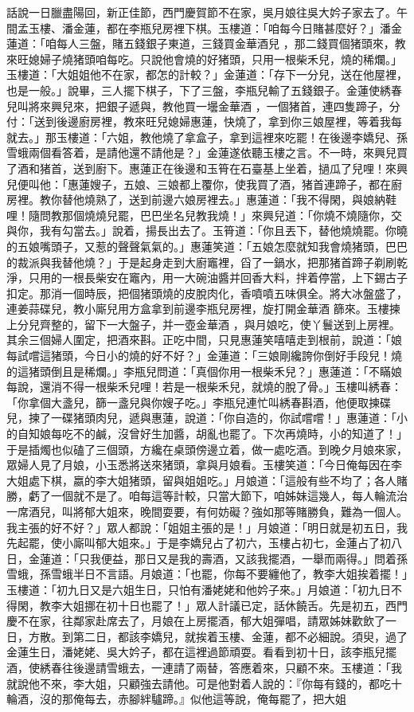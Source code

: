 \begin{showcontents}{}
話說一日臘盡陽回，新正佳節，西門慶賀節不在家，吳月娘往吳大妗子家去了。午間孟玉樓、潘金蓮，都在李瓶兒房裡下棋。玉樓道：「咱每今日賭甚麼好？」潘金蓮道：「咱每人三盤，賭五錢銀子東道，三錢買金華酒兒 ，那二錢買個猪頭來，教來旺媳婦子燒猪頭咱每吃。只說他會燒的好猪頭，只用一根柴禾兒，燒的稀爛。」玉樓道：「大姐姐他不在家，都怎的計較？」金蓮道：「存下一分兒，送在他屋裡，也是一般。」說畢，三人擺下棋子，下了三盤，李瓶兒輸了五錢銀子。金蓮使綉春兒叫將來興兒來，把銀子遞與，教他買一壜金華酒 ，一個猪首，連四隻蹄子，分付：「送到後邊廚房裡，教來旺兒媳婦惠蓮，快燒了，拿到你三娘屋裡，等着我每就去。」那玉樓道：「六姐，教他燒了拿盒子，拿到這裡來吃罷！在後邊李嬌兒、孫雪蛾兩個看答着，是請他還不請他是？」金蓮遂依聽玉樓之言。不一時，來興兒買了酒和猪首，送到廚下。惠蓮正在後邊和玉筲在石臺基上坐着，撾瓜了兒哩！來興兒便叫他：「惠蓮嫂子，五娘、三娘都上覆你，使我買了酒，猪首連蹄子，都在廚房裡。教你替他燒熟了，送到前邊六娘房裡去。」惠蓮道：「我不得閑，與娘納鞋哩！隨問教那個燒燒兒罷，巴巴坐名兒教我燒！」來興兒道：「你燒不燒隨你，交與你，我有勾當去。」說着，揚長出去了。玉筲道：「你且丟下，替他燒燒罷。你曉的五娘嘴頭子，又惹的聲聲氣氣的。」惠蓮笑道：「五娘怎麼就知我會燒猪頭，巴巴的裁派與我替他燒？」于是起身走到大廚竈裡，舀了一鍋水，把那猪首蹄子剃刷乾淨，只用的一根長柴安在竈內，用一大碗油醬并回香大料，拌着停當，上下錫古子扣定。那消一個時辰，把個猪頭燒的皮脫肉化，香噴噴五味俱全。將大冰盤盛了，連姜蒜碟兒，教小廝兒用方盒拿到前邊李瓶兒房裡，旋打開金華酒 篩來。玉樓揀上分兒齊整的，留下一大盤子，并一壺金華酒 ，與月娘吃，使丫鬟送到上房裡。其余三個婦人圍定，把酒來斟。正吃中間，只見惠蓮笑嘻嘻走到根前，說道：「娘每試嚐這猪頭，今日小的燒的好不好？」金蓮道：「三娘剛纔誇你倒好手段兒！燒的這猪頭倒且是稀爛。」李瓶兒問道：「真個你用一根柴禾兒？」惠蓮道：「不瞞娘每說，還消不得一根柴禾兒哩！若是一根柴禾兒，就燒的脫了骨。」玉樓叫綉春：「你拿個大盞兒，篩一盞兒與你嫂子吃。」李瓶兒連忙叫綉春斟酒，他便取揀碟兒，揀了一碟猪頭肉兒，遞與惠蓮，說道：「你自造的，你試嚐嚐！」惠蓮道：「小的自知娘每吃不的鹹，沒曾好生加醬，胡亂也罷了。下次再燒時，小的知道了！」于是插燭也似磕了三個頭，方纔在桌頭傍邊立着，做一處吃酒。到晚夕月娘來家，眾婦人見了月娘，小玉悉將送來猪頭，拿與月娘看。玉樓笑道：「今日俺每因在李大姐處下棋，嬴的李大姐猪頭，留與姐姐吃。」月娘道：「這般有些不均了；各人賭勝，虧了一個就不是了。咱每這等計較，只當大節下，咱姊妹這幾人，每人輪流治一席酒兒，叫將郁大姐來，晚間耍要，有何妨礙？強如那等賭勝負，難為一個人。我主張的好不好？」眾人都說：「姐姐主張的是！」月娘道：「明日就是初五日，我先起罷，使小廝叫郁大姐來。」于是李嬌兒占了初六，玉樓占初七，金蓮占了初八日，金蓮道：「只我便益，那日又是我的壽酒，又該我擺酒，一舉而兩得。」問着孫雪蛾，孫雪蛾半日不言語。月娘道：「也罷，你每不要纏他了，教李大姐挨着擺！」玉樓道：「初九日又是六姐生日，只怕有潘姥姥和他妗子來。」月娘道：「初九日不得閑，教李大姐挪在初十日也罷了！」眾人計議已定，話休饒舌。先是初五，西門慶不在家，往鄰家赴席去了，月娘在上房擺酒，郁大姐彈唱，請眾姊妹歡飲了一日，方散。到第二日，都該李嬌兒，就挨着玉樓、金蓮，都不必細說。須臾，過了金蓮生日，潘姥姥、吳大妗子，都在這裡過節頑耍。看看到初十日，該李瓶兒擺酒，使綉春往後邊請雪蛾去，一連請了兩替，答應着來，只顧不來。玉樓道：「我就說他不來，李大姐，只顧強去請他。可是他對着人說的：『你每有錢的，都吃十輪酒，沒的那俺每去，赤腳絆驢蹄。』似他這等說，俺每罷了，把大姐
\end{showcontents}
